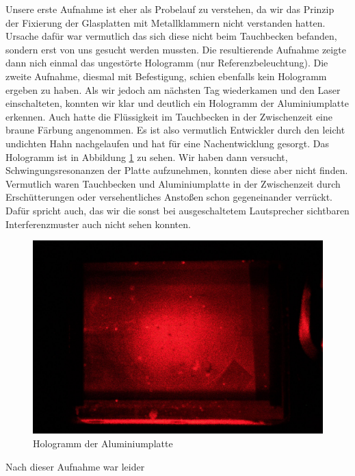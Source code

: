 Unsere erste Aufnahme ist eher als Probelauf zu verstehen, da wir das Prinzip der Fixierung der Glasplatten mit Metallklammern nicht verstanden hatten. Ursache dafür war vermutlich das sich diese nicht beim Tauchbecken befanden, sondern erst von uns gesucht werden mussten. Die resultierende Aufnahme zeigte dann nich einmal das ungestörte Hologramm (nur Referenzbeleuchtung). Die zweite Aufnahme, diesmal mit Befestigung, schien ebenfalls kein Hologramm ergeben zu haben. Als wir jedoch am nächsten Tag wiederkamen und den Laser einschalteten, konnten wir klar und deutlich ein Hologramm der Aluminiumplatte erkennen. Auch hatte die Flüssigkeit im Tauchbecken in der Zwischenzeit eine braune Färbung angenommen. Es ist also vermutlich Entwickler durch den leicht undichten Hahn nachgelaufen und hat für eine Nachentwicklung gesorgt. Das Hologramm ist in Abbildung \ref{hologramm_aluplatte} zu sehen. Wir haben dann versucht, Schwingungsresonanzen der Platte aufzunehmen, konnten diese aber nicht finden. Vermutlich waren Tauchbecken und Aluminiumplatte in der Zwischenzeit durch Erschütterungen oder versehentliches Anstoßen schon gegeneinander verrückt. Dafür spricht auch, das wir die sonst bei ausgeschaltetem Lautsprecher sichtbaren Interferenzmuster auch nicht sehen konnten.  

\begin{figure}[ht]
 \includegraphics[width=\textwidth]{Photos/IMG_3927.jpg}
 \caption{Hologramm der Aluminiumplatte}
 \label{hologramm_aluplatte}
\end{figure}

Nach dieser Aufnahme war leider 